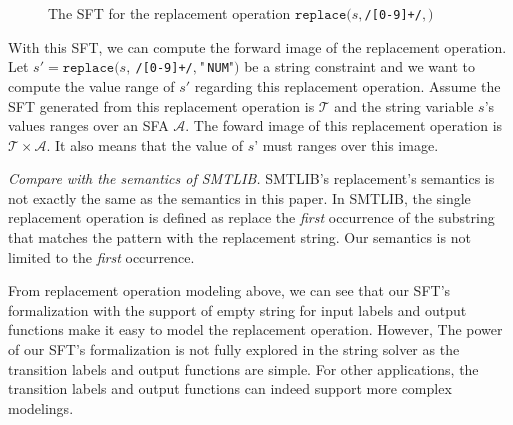 \documentclass[a4paper,UKenglish,cleveref, autoref, anonymous, thm-restate]{lipics-v2021}
\begin{document}
\begin{figure}[h] \centering
  \caption{The SFT for the replacement operation $\texttt{replace}(s, $\texttt{/[0-9]+/}$, $$)$}
  \label{fig-rearranged-automata}
  \end{figure}

  With this SFT, we can compute the forward image of the replacement operation.
  Let $s' = \texttt{replace}(s,~$\texttt{/[0-9]+/}$,~\text{"}$\texttt{NUM}$\text{"})$ be a string constraint and we want to compute the value range of $s'$ regarding this replacement operation.
  Assume the SFT generated from this replacement operation is $\mathcal{T}$ and the string variable $s$'s values ranges over an SFA $\mathcal{A}$. The foward image of this replacement operation is $\mathcal{T}\times \mathcal{A}$. It also means that the value of $s$' must ranges over this image.


  \emph{Compare with the semantics of SMTLIB.} SMTLIB's replacement's semantics is not exactly the same as the semantics  in this paper. In SMTLIB, the single replacement operation is defined as replace the \emph{first} occurrence of the substring that matches the pattern with the replacement string. Our semantics is not limited to the \emph{first} occurrence.

  From replacement operation modeling above, we can see that our SFT's formalization with the support of empty string for input labels and output functions make it easy to model the replacement operation.
  However,
  The power of our SFT's formalization is not fully explored in the string solver as the transition labels and output functions are simple. For other applications, the transition labels and output functions can indeed support more complex modelings.
\end{document}
